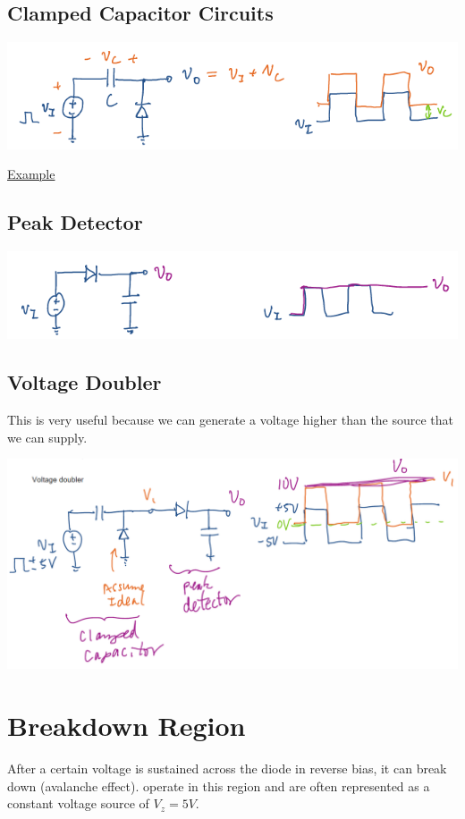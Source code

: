 \documentclass{article}
\numberwithin{equation}{section}
\begin{document}
\subsection{Clamped Capacitor Circuits}
\begin{center}
    \includegraphics[width=0.8\linewidth]{clamped capacitor.png}
\end{center}
\href{https://www.falstad.com/circuit/circuitjs.html?ctz=CQAgjCAMB0l3BWcMBMcUHYMGZIA4UA2ATmIxAUgpABZsKBTAWjDACgB3EPKsQ3-uEGQ2AYyECqaPBKhRYEJjWg1INYtgTE+CbBgIyRXabJQJCskQHMQZi7hq3zIbGjkiAJk-trvpkB4MAGYAhgCuADYALpx+fFSaKJZsAG7cUhhJPJbgtFRIVIXQCGw22ZhZCb6FbAD2coSOVKqkyPJJVBYJ1PkuubwubEA}{Example}
\subsection{Peak Detector}
\begin{center}
    \includegraphics[width=0.8\linewidth]{peak detector.png}
\end{center}
\subsection{Voltage Doubler}
This is very useful because we can generate a voltage higher than the source that we can supply.
\begin{center}
    \includegraphics[width=0.8\linewidth]{voltage doubler.png}
\end{center}
\section{Breakdown Region}
After a certain voltage is sustained across the diode in reverse bias, it can break down (avalanche effect).  operate in this region and are often represented as a constant voltage source of $V_z = 5V.$
\end{document}
